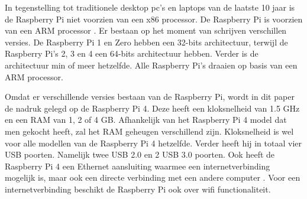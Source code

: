 \documentclass[a4paper, dutch, abstract=true]{scrartcl}
\begin{document}
In tegenstelling tot traditionele desktop pc's en laptops van de laatste 10 jaar is de Raspberry Pi
niet voorzien van een x86 processor.
De Raspberry Pi is voorzien van een ARM processor \cite{jain2014raspberry}.
Er bestaan op het moment van schrijven verschillen versies.
De Raspberry Pi 1 en Zero hebben een 32-bits architectuur, terwijl de Raspberry Pi's 2, 3 en 4 een
64-bits architectuur hebben.
Verder is de architectuur min of meer hetzelfde.
Alle Raspberry Pi's draaien op basis van een ARM processor.

Omdat er verschillende versies bestaan van de Raspberry Pi, wordt in dit paper de nadruk gelegd op
de Raspberry Pi 4.
Deze heeft een kloksnelheid van 1.5 GHz en een RAM van 1, 2 of 4 GB.
Afhankelijk van het Raspberry Pi 4 model dat men gekocht heeft, zal het RAM geheugen verschillend
zijn.
Kloksnelheid is wel voor alle modellen van de Raspberry Pi 4 hetzelfde.
Verder heeft hij in totaal vier USB poorten.
Namelijk twee USB 2.0 en 2 USB 3.0 poorten.
Ook heeft de Raspberry Pi 4 een Ethernet aansluiting waarmee een internetverbinding mogelijk is,
maar ook een directe verbinding met een andere computer \cite{maksimovic2014raspberry}.
Voor een internetverbinding beschikt de Raspberry Pi ook over wifi functionaliteit.
\end{document}
